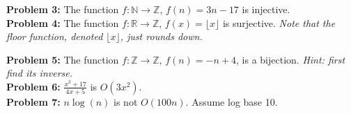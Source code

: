 \documentclass[12pt]{article}
\def\R{\mathbb R} %
\def\Z{\mathbb Z}
\def\N{\mathbb N}
\begin{document}
{\bf Problem 3:} The function $f:\N \rightarrow \Z$, $f(n)= 3n-17$ is injective.\\

{\bf Problem 4:} The function $f:\R \rightarrow \Z$, $f(x)= \lfloor x \rfloor$ is surjective. \textit{Note that the floor function, denoted $\lfloor x \rfloor$, just rounds down. \\}

{\bf Problem 5:} The function $f:\Z \rightarrow \Z$, $f(n)=-n + 4$, is a bijection. \textit{Hint: first find its inverse.} \\

{\bf Problem 6:} $\frac{x^3+17}{4x+5}$ is $O(3x^2)$. \\

{\bf Problem 7:} $n \log(n)$ is not $O(100 n)$. Assume log base 10.\\
\end{document}
